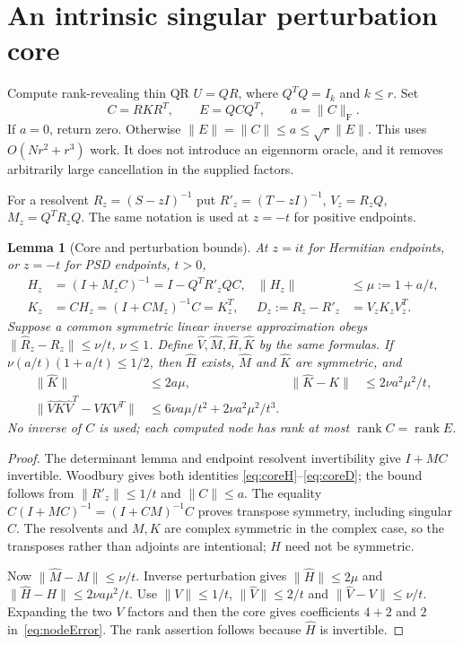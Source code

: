 \documentclass[11pt]{article}
\newtheorem{lemma}[theorem]{Lemma}
\numberwithin{equation}{section}
\newcommand{\rank}{\operatorname{rank}}
\newcommand{\Frob}{\mathrm F}
\begin{document}
\section{An intrinsic singular perturbation core}

Compute rank-revealing thin QR $U=QR$, where $Q^TQ=I_k$ and $k\le r$.
Set
\begin{equation}\label{eq:intrinsic}
 C=RKR^T,\qquad E=QCQ^T,\qquad a=\|C\|_{\Frob}.
\end{equation}
If $a=0$, return zero. Otherwise
$\|E\|=\|C\|\le a\le\sqrt r\|E\|$.
This uses $O(Nr^2+r^3)$ work. It does not introduce an eigennorm oracle,
and it removes arbitrarily large cancellation in the supplied factors.

For a resolvent $R_z=(S-zI)^{-1}$ put
$R'_z=(T-zI)^{-1}$, $V_z=R_zQ$, $M_z=Q^TR_zQ$.
The same notation is used at $z=-t$ for positive endpoints.

\begin{lemma}[Core and perturbation bounds]\label{lem:core}
At $z=it$ for Hermitian endpoints, or $z=-t$ for PSD endpoints, $t>0$,
\begin{align}
 H_z&=(I+M_zC)^{-1}=I-Q^TR'_zQC,&\|H_z\|&\le\mu:=1+a/t,
                                                        \label{eq:coreH}\\
 K_z&=CH_z=(I+CM_z)^{-1}C=K_z^T,&
 D_z:=R_z-R'_z&=V_zK_zV_z^T.             \label{eq:coreD}
\end{align}
Suppose a common symmetric linear inverse approximation obeys
$\|\widehat R_z-R_z\|\le\nu/t$, $\nu\le1$.
Define $\widehat V,\widehat M,\widehat H,\widehat K$ by the same formulas.
If $\nu(a/t)(1+a/t)\le1/2$, then $\widehat H$ exists,
$\widehat M$ and $\widehat K$ are symmetric, and
\begin{align}
 \|\widehat K\|&\le2a\mu,&
 \|\widehat K-K\|&\le2\nu a^2\mu^2/t,\\
 \|\widehat V\widehat K\widehat V^T-VKV^T\|
       &\le6\nu a\mu/t^2+2\nu a^2\mu^2/t^3.   \label{eq:nodeError}
\end{align}
No inverse of $C$ is used; each computed node has rank at most
$\rank C=\rank E$.
\end{lemma}
\begin{proof}
The determinant lemma and endpoint resolvent invertibility give
$I+MC$ invertible. Woodbury gives both identities
\eqref{eq:coreH}--\eqref{eq:coreD}; the bound follows from
$\|R'_z\|\le1/t$ and $\|C\|\le a$. The equality
$C(I+MC)^{-1}=(I+CM)^{-1}C$ proves transpose symmetry, including
singular $C$. The resolvents and $M,K$ are complex symmetric in the
complex case, so the transposes rather than adjoints are intentional;
$H$ need not be symmetric.

Now $\|\widehat M-M\|\le\nu/t$. Inverse perturbation gives
$\|\widehat H\|\le2\mu$ and
$\|\widehat H-H\|\le2\nu a\mu^2/t$.
Use $\|V\|\le1/t$, $\|\widehat V\|\le2/t$ and
$\|\widehat V-V\|\le\nu/t$. Expanding the two $V$ factors and then
the core gives coefficients $4+2$ and $2$ in~\eqref{eq:nodeError}.
The rank assertion follows because $\widehat H$ is invertible.
\end{proof}
\end{document}
